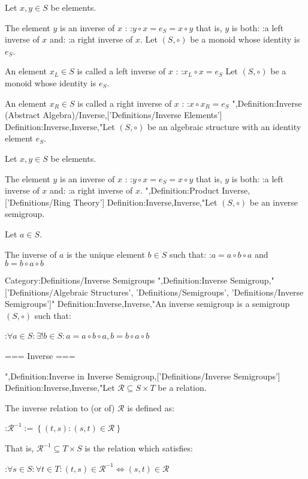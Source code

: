 Let $x, y \in S$ be elements.


The element $y$ is an inverse of $x$ :
:$y \circ x = e_S = x \circ y$
that is,  $y$ is both:
:a left inverse of $x$
and:
:a right inverse of $x$.
Let $\left( S, \circ \right)$ be a monoid whose identity is $e_S$.

An element $x_L \in S$ is called a left inverse of $x$ :
:$x_L \circ x = e_S$
Let $\left( S, \circ \right)$ be a monoid whose identity is $e_S$.

An element $x_R \in S$ is called a right inverse of $x$ :
:$x \circ x_R = e_S$
",Definition:Inverse (Abstract Algebra)/Inverse,['Definitions/Inverse Elements']
Definition:Inverse,Inverse,"Let $\left( S, \circ \right)$ be an algebraic structure with an identity element $e_S$.

Let $x, y \in S$ be elements.


The element $y$ is an inverse of $x$ :
:$y \circ x = e_S = x \circ y$
that is,  $y$ is both:
:a left inverse of $x$
and:
:a right inverse of $x$.
",Definition:Product Inverse,['Definitions/Ring Theory']
Definition:Inverse,Inverse,"Let $(S, \circ)$ be an inverse semigroup.

Let $a\in S$.


The inverse of $a$ is the unique element $b\in S$ such that:
:$a = a \circ b \circ a$ and $b = b \circ a \circ b$


Category:Definitions/Inverse Semigroups
",Definition:Inverse Semigroup,"['Definitions/Algebraic Structures', 'Definitions/Semigroups', 'Definitions/Inverse Semigroups']"
Definition:Inverse,Inverse,"An inverse semigroup is a semigroup $\left( S, \circ \right)$ such that:

:$\forall a \in S: \exists! b \in S: a = a \circ b \circ a, b = b \circ a \circ b$


=== Inverse ===

",Definition:Inverse in Inverse Semigroup,['Definitions/Inverse Semigroups']
Definition:Inverse,Inverse,"Let $\mathcal R \subseteq S \times T$ be a relation.


The inverse relation to (or of) $\mathcal R$ is defined as:

:$\mathcal R^{-1} := \left\lbrace \left( t, s \right): \left( s, t \right) \in \mathcal R \right\rbrace$


That is, $\mathcal R^{-1} \subseteq T \times S$ is the relation which satisfies:

:$\forall s \in S: \forall t \in T: \left( t, s \right) \in \mathcal R^{-1} \iff \left( s, t \right) \in \mathcal R$



